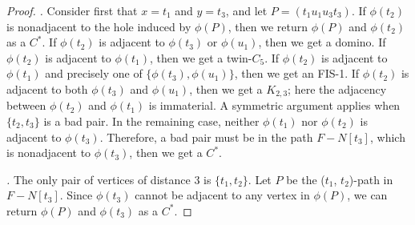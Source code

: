 \documentclass[10pt]{article}
\newcommand{\stpath}[2]{($#1$, $#2$)-path}
\newcommand{\og}[1]{\ensuremath{\phi(#1)}}
\begin{document}
\begin{proof}
  {\em \dag.}  Consider first that $x = t_1$ and $y = t_3$, and let $P
  = (t_1 u_1 u_3 t_3)$.  If \og{t_2} is nonadjacent to the hole
  induced by \og{P}, then we return \og{P} and \og{t_2} as a $C^*$.
  If \og{t_2} is adjacent to \og{t_3} or \og{u_1}, then we get a
  domino.  If \og{t_2} is adjacent to \og{t_1}, then we get a
  twin-$C_5$.  If \og{t_2} is adjacent to \og{t_1} and precisely one
  of $\{\og{t_3}, \og{u_1}\}$, then we get an FIS-1.  If \og{t_2} is
  adjacent to both \og{t_3} and \og{u_1}, then we get a $K_{2,3}$;
  here the adjacency between \og{t_2} and \og{t_1} is immaterial.  A
  symmetric argument applies when $\{t_2, t_3\}$ is a bad pair.  In
  the remaining case, neither \og{t_1} nor \og{t_2} is adjacent to
  \og{t_3}.  Therefore, a bad pair must be in the path $F - N[t_3]$,
  which is nonadjacent to \og{t_3}, then we get a $C^*$.

  {\em \ddag.} The only pair of vertices of distance $3$ is $\{t_1,
  t_2\}$.  Let $P$ be the \stpath{t_1}{t_2} in $F - N[t_3]$.  Since
  $\og{t_3}$ cannot be adjacent to any vertex in $\og{P}$, we can
  return \og{P} and \og{t_3} as a $C^*$.
\end{proof}
\end{document}
